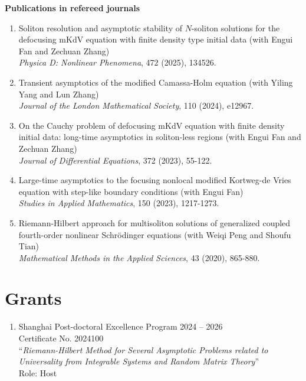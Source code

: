 \documentclass[margin]{res}
\begin{document}
\begin{resume}
\textbf{Publications in refereed journals}
\begin{enumerate}[1.]
    \item Soliton resolution and asymptotic stability of $N$-soliton solutions for the defocusing mKdV equation with finite density type initial data (with Engui Fan and Zechuan Zhang)\\ 
    {\sl Physica D: Nonlinear Phenomena}, 472 (2025), 134526. 

    \item Transient asymptotics of the modified Camassa-Holm equation (with Yiling Yang and Lun Zhang) \\
    {\sl Journal of the London Mathematical Society}, 110 (2024), e12967. 

    \item On the Cauchy problem of defocusing mKdV equation with finite density initial data: long-time asymptotics in soliton-less regions (with Engui Fan and Zechuan Zhang)\\
    {\sl Journal of Differential Equations}, 372 (2023), 55-122.

    \item Large-time asymptotics to the focusing nonlocal modified Kortweg-de Vries equation with step-like boundary conditions (with Engui Fan)\\
    {\sl Studies in Applied Mathematics}, 150 (2023), 1217-1273. 
    
    \item Riemann-Hilbert approach for multisoliton solutions of generalized coupled fourth-order nonlinear Schr\"odinger equations
    (with Weiqi Peng and Shoufu Tian)\\
    {\sl Mathematical Methods in the Applied Sciences}, 43 (2020), 865-880.
\end{enumerate}

\section{Grants}
\begin{enumerate}[--]
\item Shanghai Post-doctoral Excellence Program \hfill 2024 -- 2026  \\
Certificate No. 2024100\\
``{\sl Riemann-Hilbert Method for Several Asymptotic Problems related to Universality from Integrable Systems and Random Matrix Theory}''  \\
Role: Host


\end{enumerate}
\end{resume}
\end{document}
